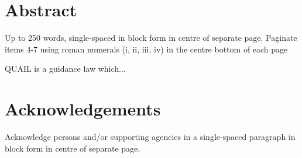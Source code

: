 \section*{Abstract}

Up to 250 words, single-spaced in block form in centre of separate page.
Paginate items 4-7 using roman numerals (i, ii, iii, iv) in the centre
bottom of each page

QUAIL is a guidance law which...

\section*{Acknowledgements}

Acknowledge persons and/or supporting agencies in a single-spaced
paragraph in block form in centre of separate page.